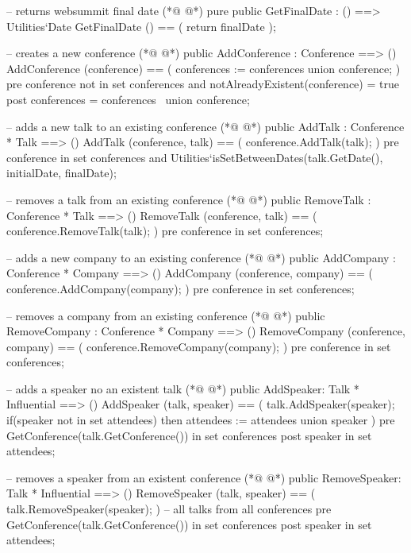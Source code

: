 \begin{vdmpp}[breaklines=true]
  -- returns websummit final date
(*@
\label{GetFinalDate:62}
@*)
  pure public GetFinalDate : () ==> Utilities`Date
    GetFinalDate () == (
     return finalDate
    ); 
   
   -- creates a new conference
(*@
\label{AddConference:68}
@*)
  public AddConference : Conference ==> ()
    AddConference (conference) == (
     conferences := conferences union {conference};
    )
    pre conference not in set conferences and notAlreadyExistent(conference) = true
   post conferences = conferences~ union {conference};
   
  -- adds a new talk to an existing conference
(*@
\label{AddTalk:76}
@*)
  public AddTalk : Conference * Talk ==> ()
    AddTalk (conference, talk) == (
     conference.AddTalk(talk);
    )
    pre conference in set conferences and
      Utilities`isSetBetweenDates(talk.GetDate(), initialDate, finalDate);
      
  -- removes a talk from an existing conference
(*@
\label{RemoveTalk:84}
@*)
   public RemoveTalk : Conference * Talk ==> ()
    RemoveTalk (conference, talk) == (
     conference.RemoveTalk(talk);
    )
    pre conference in set conferences;
      
  -- adds a new company to an existing conference
(*@
\label{AddCompany:91}
@*)
   public AddCompany : Conference * Company ==> ()
    AddCompany (conference, company) == (
     conference.AddCompany(company);
    )
    pre conference in set conferences;
    
   -- removes a company from an existing conference
(*@
\label{RemoveCompany:98}
@*)
   public RemoveCompany : Conference * Company ==> ()
    RemoveCompany (conference, company) == (
     conference.RemoveCompany(company);
    )
    pre conference in set conferences;
    
    
   -- adds a speaker no an existent talk
(*@
\label{AddSpeaker:106}
@*)
   public AddSpeaker: Talk * Influential ==> ()
    AddSpeaker (talk, speaker) == (
     talk.AddSpeaker(speaker);
     if(speaker not in set attendees)
      then attendees := attendees union {speaker}
    )
    pre GetConference(talk.GetConference()) in set conferences 
    post speaker in set attendees;  
   
   -- removes a speaker from an existent conference
(*@
\label{RemoveSpeaker:116}
@*)
   public RemoveSpeaker: Talk * Influential ==> ()
    RemoveSpeaker (talk, speaker) == (
     talk.RemoveSpeaker(speaker);
    )
    -- all talks from all conferences 
    pre GetConference(talk.GetConference()) in set conferences 
    post speaker in set attendees;
    

\end{vdmpp}
